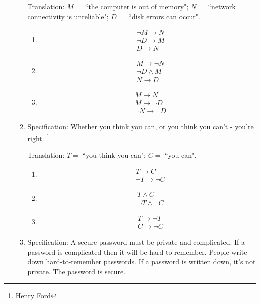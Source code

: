 \documentclass[12pt, oneside]{article}
\begin{document}
\begin{enumerate}
\begin{enumerate}
    Translation: $M =$ ``the computer is  out of memory"; $N = $ ``network connectivity
    is unreliable"; $D = $  ``disk errors  can occur".
    
    \begin{enumerate}
        \item \begin{align*} &\neg M \to  N  \\ & \neg D \to M \\ & D \to N \end{align*}
        \item \begin{align*} &M \to  \neg N  \\ & \neg D \wedge M \\ & N \to D \end{align*}
        \item \begin{align*} &M \to  N  \\ &  M \to \neg D \\ & \neg  N \to \neg D \end{align*}
    \end{enumerate}
    
    \newpage
    \item Specification: Whether you think you can, or you think you can't - you're right.
\footnote{Henry Ford}
    
    Translation: $T =$ ``you  think  you  can"; $C = $  ``you  can".
    
    \begin{enumerate}
        \item \begin{align*} &T \to C \\&  \neg T \to \neg C \end{align*}
        \item \begin{align*} &T \wedge C \\  & \neg  T \wedge \neg C \end{align*}
        \item \begin{align*} &T \to \neg T  \\ & C  \to \neg  C \end{align*}
    \end{enumerate}
    
    \item Specification: A secure password must be private and complicated. If
    a password is  complicated then  it will be hard to  remember.  People
    write down hard-to-remember passwords. If a password is written down, it's  not private.   The password is secure.


\end{enumerate}
\end{enumerate}
\end{document}

